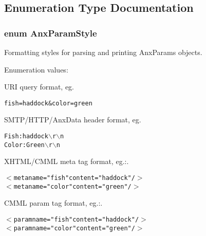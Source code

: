 \subsection{Enumeration Type Documentation}
\subsubsection{\setlength{\rightskip}{0pt plus 5cm}enum {\bf Anx\-Param\-Style}}\label{anx__params_8h_a14}


Formatting styles for parsing and printing Anx\-Params objects. 

\begin{Desc}
\item[Enumeration values: ]\par
\begin{description}
\item[{\em 
ANX\_\-PARAMS\_\-QUERY\label{anx__params_8h_a14a1}
}]URI query format, eg. 

\small\begin{alltt}fish=haddock\&color=green
      \end{alltt}\normalsize 
 \item[{\em 
ANX\_\-PARAMS\_\-HEADERS\label{anx__params_8h_a14a2}
}]SMTP/HTTP/Anx\-Data header format, eg. 

\small\begin{alltt}
      Fish: haddock$\backslash$r$\backslash$n
      Color: Green$\backslash$r$\backslash$n
      \end{alltt}\normalsize 
 \item[{\em 
ANX\_\-PARAMS\_\-METATAGS\label{anx__params_8h_a14a3}
}]XHTML/CMML meta tag format, eg.:. 

\small\begin{alltt}
      $<$meta name="fish" content="haddock"/$>$
      $<$meta name="color" content="green"/$>$
      \end{alltt}\normalsize 
 \item[{\em 
ANX\_\-PARAMS\_\-PARAMTAGS\label{anx__params_8h_a14a4}
}]CMML param tag format, eg.:. 

\small\begin{alltt}
      $<$param name="fish" content="haddock"/$>$
      $<$param name="color" content="green"/$>$
      \end{alltt}\normalsize 
 \end{description}
\end{Desc}
